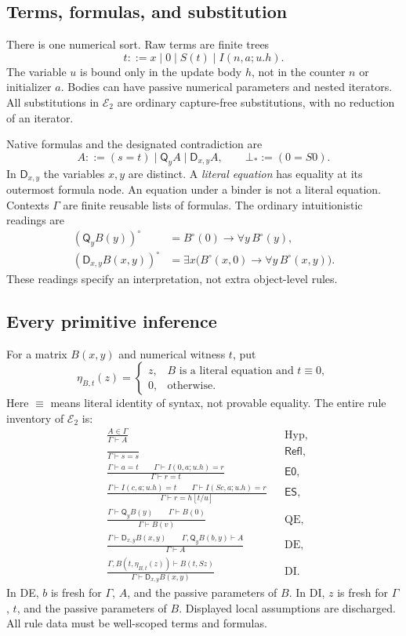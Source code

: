 \documentclass[11pt]{article}
\theoremstyle{definition}\newtheorem{definition}[theorem]{Definition}
\newcommand{\Rtwo}{\mathcal E_2}
\newcommand{\Q}{\mathsf Q}
\newcommand{\D}{\mathsf D}
\newcommand{\syn}{\equiv}
\newcommand{\Refl}{\mathsf{Refl}}
\newcommand{\evz}{\mathsf{E0}}
\newcommand{\evs}{\mathsf{ES}}
\begin{document}
\subsection{Terms, formulas, and substitution}

There is one numerical sort. Raw terms are finite trees
\[
 t ::= x\mid 0\mid S(t)\mid I(n,a;u.h).
\]
The variable $u$ is bound only in the update body $h$, not in the counter
$n$ or initializer $a$. Bodies can have passive numerical parameters and
nested iterators. All substitutions in $\Rtwo$ are ordinary capture-free
substitutions, with no reduction of an iterator.

Native formulas and the designated contradiction are
\[
 A ::= (s=t)\mid\Q_y A\mid\D_{x,y}A,
 \qquad \bot_*:=(0=S0).
\]
In $\D_{x,y}$ the variables $x,y$ are distinct. A \emph{literal equation}
has equality at its outermost formula node. An equation under a binder
is not a literal equation. Contexts $\Gamma$ are finite reusable lists
of formulas. The ordinary intuitionistic readings are
\begin{align*}
 (\Q_y B(y))^\circ&=B^\circ(0)\to\forall y\,B^\circ(y),\\
 (\D_{x,y}B(x,y))^\circ
   &=\exists x\bigl(B^\circ(x,0)\to\forall y\,B^\circ(x,y)\bigr).
\end{align*}
These readings specify an interpretation, not extra object-level rules.

\subsection{Every primitive inference}

For a matrix $B(x,y)$ and numerical witness $t$, put
\[
 \eta_{B,t}(z)=
 \begin{cases}
 z,&B\text{ is a literal equation and }t\syn0,\\
 0,&\text{otherwise}.
 \end{cases}
\]
Here $\syn$ means literal identity of syntax, not provable equality.
The entire rule inventory of $\Rtwo$ is:
\begin{align*}
 &\frac{A\in\Gamma}{\Gamma\vdash A}&&\mathrm{Hyp},\\[3pt]
 &\frac{}{\Gamma\vdash s=s}&&\Refl,\\[3pt]
 &\frac{\Gamma\vdash a=t\qquad\Gamma\vdash I(0,a;u.h)=r}
        {\Gamma\vdash r=t}&&\evz,\\[3pt]
 &\frac{\Gamma\vdash I(c,a;u.h)=t\qquad
          \Gamma\vdash I(Sc,a;u.h)=r}
        {\Gamma\vdash r=h[t/u]}&&\evs,\\[3pt]
 &\frac{\Gamma\vdash\Q_yB(y)\qquad\Gamma\vdash B(0)}
        {\Gamma\vdash B(v)}&&\mathrm{QE},\\[3pt]
 &\frac{\Gamma\vdash\D_{x,y}B(x,y)\qquad
          \Gamma,\Q_yB(b,y)\vdash A}
        {\Gamma\vdash A}&&\mathrm{DE},\\[3pt]
 &\frac{\Gamma,B(t,\eta_{B,t}(z))\vdash B(t,Sz)}
        {\Gamma\vdash\D_{x,y}B(x,y)}&&\mathrm{DI}.
\end{align*}
In DE, $b$ is fresh for $\Gamma$, $A$, and the passive parameters of
$B$. In DI, $z$ is fresh for $\Gamma$, $t$, and the passive parameters
of $B$. Displayed local assumptions are discharged. All rule data must
be well-scoped terms and formulas.
\end{document}
